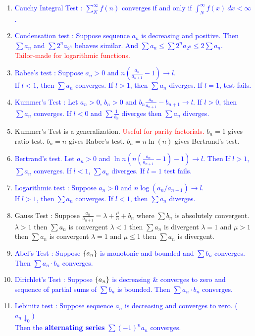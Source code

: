 \begin{enumerate}
\begin{enumerate}
\begin{proof}
			$$ m \sum \frac{1}{n} < \sum a_n \implies \sum a_n = \infty $$
		\end{proof}
		\end{enumerate}
	\item \textcolor{blue}{Cauchy Integral Test : $\sum_N^\infty f(n)$ converges if and only if $\int_N^\infty f(x)\ dx < \infty$.}
	\item \textcolor{blue}{Condensation test : Suppose sequence $a_n$ is decreasing and positive.
	Then $\sum a_n$ and $\sum 2^na_{2^n}$ behaves similar.
	And $\sum a_n \le \sum 2^n a_{2^n} \le 2 \sum a_n$.\\
	\textcolor{red}{Tailor-made for logarithmic functions.}}
	\item \textcolor{blue}{Rabee's test : Suppose $a_n > 0$ and $n\left(\frac{a_n}{a_{n+1}} -1 \right) \to l$.\\
		If $l < 1$, then $\sum a_n$ converges. If $l > 1$, then $\sum a_n$ diverges. If $l = 1$, test fails.}
	\item \textcolor{blue}{Kummer's Test : Let $a_n > 0$, $b_n > 0$ and $b_n \frac{a_n}{a_{n+1}} - b_{n+1} \to l$. %
		\subitem If $l > 0$, then $\sum a_n$ converges. 
		\subitem If $l < 0$ and $\sum \frac{1}{b_n}$ diverges then $\sum a_n$ diverges.}
	\item Kummer's Test is a generalization. %
	\textcolor{red}{Useful for parity factorials.}
		\subitem $b_n = 1$ gives ratio test.
		\subitem $b_n = n$ gives Rabee's test.
		\subitem $b_n = n\ln(n)$ gives Bertrand's test.
	\item \textcolor{blue}{Bertrand's test. %
		Let $a_n >0$ and $\displaystyle \ln n\left( n (\frac{a_n}{a_{n+1}}-1)-1\right) \to l$. Then
		\subitem If $l>1$, $\sum a_n$ converges.
		\subitem If $l<1$, $\sum a_n$ diverges.
		\subitem If $l = 1$ test fails.}
	\item \textcolor{blue}{Logarithmic test : Suppose $a_n > 0$ and $n\log (a_n/a_{n+1}) \to l$.\\
		If $l > 1$, then $\sum a_n$ converges. If $l <1$, then $\sum a_n$ diverges.}
	\item Gauss Test : Suppose $\displaystyle \frac{a_n}{a_{n+1}} = \lambda + \displaystyle \frac{\mu}{n} + b_n$ where $\sum b_n$ is absolutely convergent.
		\subitem $\lambda > 1$ then $\sum a_n$ is convergent
		\subitem $\lambda < 1$ then $\sum a_n$ is divergent
		\subitem $\lambda = 1$ and $\mu > 1$ then $\sum a_n$ is convergent
		\subitem $\lambda = 1$ and $\mu \le 1$ then $\sum a_n$ is divergent.
	\item \textcolor{blue}{Abel's Test : Suppose $\{a_n\}$ is monotonic and bounded and $\sum b_n$ converges. Then $\sum a_n \cdot b_n$ converges.}
	\item \textcolor{blue}{Dirichlet's Test : Suppose $\{a_n\}$ is decreasing \& converges to zero and sequence of partial sums of $\sum b_n$ is bounded. Then $\sum a_n \cdot b_n$ converges.}
	\item \textcolor{blue}{Lebinitz test : Suppose sequence $a_n$ is decreasing and converges to zero. ($a_n \downarrow_0$)\\
		Then the \textbf{alternating series} $\sum (-1)^n a_n$ converges.}
\end{enumerate}
